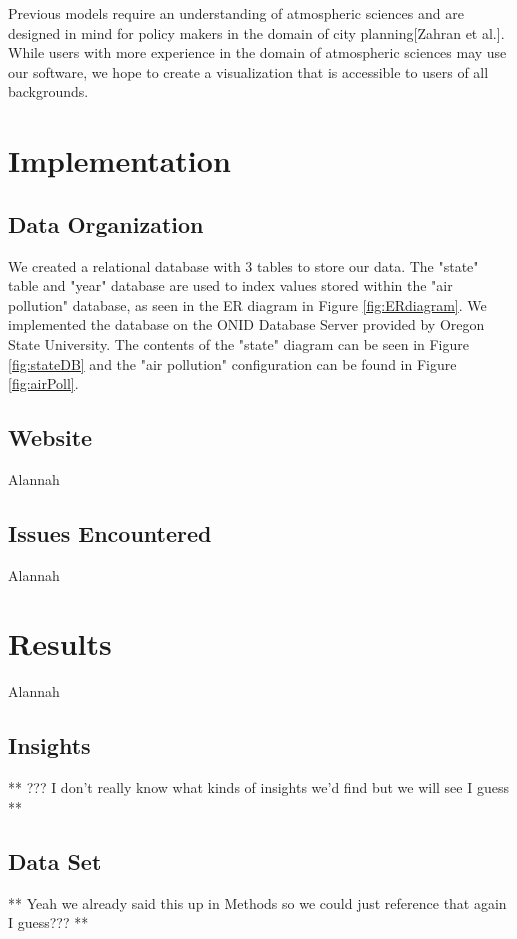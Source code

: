 \documentclass[journal]{vgtc}                %
\begin{document}
Previous models require an understanding of atmospheric sciences and are designed in mind for policy makers in the domain
of city planning[Zahran et al.]. While users with more experience in the domain of atmospheric sciences may use our
software, we hope to create a visualization that is accessible to users of all backgrounds.

\section{Implementation}

\subsection{Data Organization}
We created a relational database with 3 tables to store our data. The "state" table and "year" database are used to
index values stored within the "air pollution" database, as seen in the ER diagram in Figure \ref{fig:ERdiagram}.
We implemented the database on the ONID Database Server provided by Oregon State University. The contents
of the "state" diagram can be seen in Figure \ref{fig:stateDB} and the "air pollution" configuration can be found in 
Figure \ref{fig:airPoll}.

\subsection{Website}
Alannah

\subsection{Issues Encountered}
Alannah

\section{Results}
Alannah

\subsection{Insights}

** ??? I don't really know what kinds of insights we'd find but we will see I guess **

\subsection{Data Set}

** Yeah we already said this up in Methods so we could just reference that again I guess??? **
\end{document}
